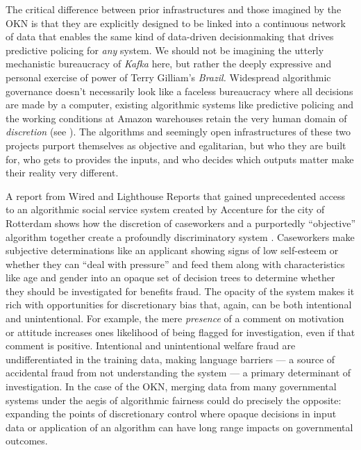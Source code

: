\documentclass{article}
\begin{document}
The critical difference between prior infrastructures and those imagined
by the OKN is that they are explicitly designed to be linked into a
continuous network of data that enables the same kind of data-driven
decisionmaking that drives predictive policing for \emph{any} system. We
should not be imagining the utterly mechanistic bureaucracy of
\emph{Kafka} here, but rather the deeply expressive and personal
exercise of power of Terry Gilliam's \emph{Brazil.} Widespread
algorithmic governance doesn't necessarily look like a faceless
bureaucracy where all decisions are made by a computer, existing
algorithmic systems like predictive policing and the working conditions
at Amazon warehouses retain the very human domain of \emph{discretion}
(see \cite{hongPredictionExtractionDiscretion2022} ). The
algorithms and seemingly open infrastructures of these two projects
purport themselves as objective and egalitarian, but who they are built
for, who gets to provides the inputs, and who decides which outputs
matter make their reality very different.

A report from Wired and Lighthouse Reports that gained unprecedented
access to an algorithmic social service system created by Accenture for
the city of Rotterdam shows how the discretion of caseworkers and a
purportedly ``objective'' algorithm together create a profoundly
discriminatory system \cite{constantarasSuspicionMachine2023, braunSuspicionMachinesMethodology2023} . Caseworkers make subjective
determinations like an applicant showing signs of low self-esteem or
whether they can ``deal with pressure'' and feed them along with
characteristics like age and gender into an opaque set of decision trees
to determine whether they should be investigated for benefits fraud. The
opacity of the system makes it rich with opportunities for discretionary
bias that, again, can be both intentional and unintentional. For
example, the mere \emph{presence} of a comment on motivation or attitude
increases ones likelihood of being flagged for investigation, even if
that comment is positive. Intentional and unintentional welfare fraud
are undifferentiated in the training data, making language barriers ---
a source of accidental fraud from not understanding the system --- a
primary determinant of investigation. In the case of the OKN, merging
data from many governmental systems under the aegis of algorithmic
fairness could do precisely the opposite: expanding the points of
discretionary control where opaque decisions in input data or
application of an algorithm can have long range impacts on governmental
outcomes.
\end{document}
